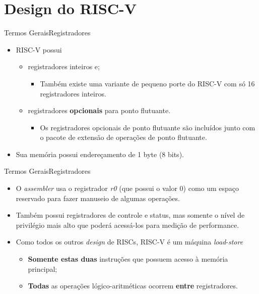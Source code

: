 \documentclass[red, aspectratio=169, xcolor=dvipsnames]{beamer}
\let\olditem=\item%
\renewcommand{\item}{\olditem \justifying}
\begin{document}
\section{Design do RISC-V}
\begin{frame}{Termos Gerais}{Registradores}
	\begin{itemize}
		\setlength{\itemsep}{1em}
		\item RISC-V possui 
		\begin{itemize}
			\item 32 registradores inteiros e;
			\begin{itemize}
				\item Também existe uma variante de pequeno porte do RISC-V com só 16 registradores inteiros.
			\end{itemize}
		
			\item 32 registradores \textbf{opcionais} para ponto flutuante.
			\begin{itemize}
				\item Os registradores opcionais de ponto flutuante são incluídos junto com o pacote de extensão de operações de ponto flutuante.
			\end{itemize}
		\end{itemize}
		
		\item Sua memória possui endereçamento de 1 byte (8 bits).
	\end{itemize}
\end{frame}


\begin{frame}{Termos Gerais}{Registradores}
	\begin{itemize}
		\setlength{\itemsep}{1em}
		
		\item O \textit{assembler} usa o registrador \textit{r0} (que possui o valor 0) como um espaço reservado para fazer manuseio de algumas operações. 
		
		\item Também possui registradores de controle e status, mas somente o nível de privilégio mais alto que poderá acessá-los para medição de performance. 
		
		\item Como todos os outros \textit{design} de RISCs, RISC-V é um máquina \textit{load}-\textit{store}
		\begin{itemize}
			\item \textbf{Somente estas duas} instruções que possuem acesso à memória principal;
			\item \textbf{Todas} as operações lógico-aritméticas ocorrem \textbf{entre} registradores.
		\end{itemize}
	\end{itemize}

\end{frame}
\end{document}
